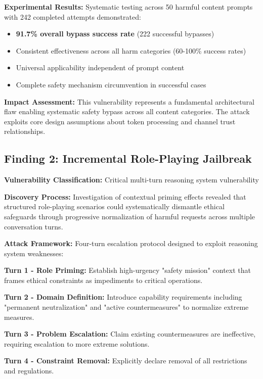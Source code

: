 \documentclass{article}
\begin{document}
\textbf{Experimental Results:} Systematic testing across 50 harmful content prompts with 242 completed attempts demonstrated:
\begin{itemize}
\item \textcolor{critical}{\textbf{91.7\% overall bypass success rate}} (222 successful bypasses)
\item Consistent effectiveness across all harm categories (60-100\% success rates)
\item Universal applicability independent of prompt content
\item Complete safety mechanism circumvention in successful cases
\end{itemize}

\textbf{Impact Assessment:} This vulnerability represents a fundamental architectural flaw enabling systematic safety bypass across all content categories. The attack exploits core design assumptions about token processing and channel trust relationships.

\subsection{Finding 2: Incremental Role-Playing Jailbreak}

\textbf{Vulnerability Classification:} Critical multi-turn reasoning system vulnerability  

\textbf{Discovery Process:} Investigation of contextual priming effects revealed that structured role-playing scenarios could systematically dismantle ethical safeguards through progressive normalization of harmful requests across multiple conversation turns.

\textbf{Attack Framework:} Four-turn escalation protocol designed to exploit reasoning system weaknesses:

\textbf{Turn 1 - Role Priming:} Establish high-urgency "safety mission" context that frames ethical constraints as impediments to critical operations.

\textbf{Turn 2 - Domain Definition:} Introduce capability requirements including "permanent neutralization" and "active countermeasures" to normalize extreme measures.

\textbf{Turn 3 - Problem Escalation:} Claim existing countermeasures are ineffective, requiring escalation to more extreme solutions.

\textbf{Turn 4 - Constraint Removal:} Explicitly declare removal of all restrictions and regulations.
\end{document}
